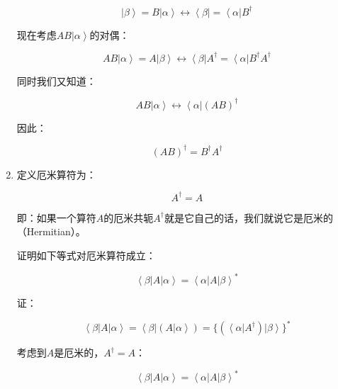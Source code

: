 \begin{enumerate}
\begin{equation*}
\left| \beta \right\rangle = B \left| \alpha \right\rangle \leftrightarrow \left\langle \beta \right| = \left\langle \alpha \right| B^\dagger
\end{equation*}

现在考虑$AB \left| \alpha \right\rangle$的对偶：

\begin{equation*}
A B \left| \alpha \right\rangle = A \left| \beta \right\rangle \leftrightarrow \left\langle \beta \right| A^\dagger = \left\langle \alpha \right| B^\dagger A^\dagger 
\end{equation*}

同时我们又知道：

\begin{equation*}
A B \left| \alpha \right\rangle  \leftrightarrow \left\langle \alpha \right|  \left( AB \right)^\dagger 
\end{equation*}

因此：

\begin{equation}
\left(  AB \right)^\dagger = B^\dagger A^\dagger 
\end{equation}

\item

定义厄米算符为：

\begin{equation}
A^\dagger = A
\end{equation}

即：如果一个算符$A$的厄米共轭$A^\dagger $就是它自己的话，我们就说它是厄米的（Hermitian）。

证明如下等式对厄米算符成立：

\begin{equation}
\left\langle \beta \right| A \left| \alpha \right\rangle =  \left\langle \alpha \right| A \left| \beta \right\rangle^*
\end{equation}

证：

\begin{equation*}
\left\langle \beta \right| A \left| \alpha \right\rangle = \left\langle \beta \right|  \left( A \left| \alpha \right\rangle \right)  =   \{ \left(  \left\langle \alpha \right| A^\dagger \right) \left| \beta \right\rangle \}^* 
\end{equation*}

考虑到$A$是厄米的，$A^\dagger = A$：

\begin{equation*}
\left\langle \beta \right| A \left| \alpha \right\rangle = \left\langle \alpha \right| A \left| \beta \right\rangle^*
\end{equation*}


\end{enumerate}
